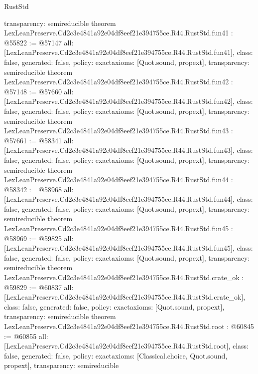 \begin{lexlean}{RustStd}
\begin{coremodule}
{  transparency: semireducible
}
theorem LexLeanPreserve.Cd2c3e4841a92e04df8eef21e394755ce.R44.RustStd.fun41 : @55822 := @57147 {
  all: [LexLeanPreserve.Cd2c3e4841a92e04df8eef21e394755ce.R44.RustStd.fun41],
  class: false,
  generated: false,
  policy: exact{axioms: [Quot.sound, propext]},
  transparency: semireducible
}
theorem LexLeanPreserve.Cd2c3e4841a92e04df8eef21e394755ce.R44.RustStd.fun42 : @57148 := @57660 {
  all: [LexLeanPreserve.Cd2c3e4841a92e04df8eef21e394755ce.R44.RustStd.fun42],
  class: false,
  generated: false,
  policy: exact{axioms: [Quot.sound, propext]},
  transparency: semireducible
}
theorem LexLeanPreserve.Cd2c3e4841a92e04df8eef21e394755ce.R44.RustStd.fun43 : @57661 := @58341 {
  all: [LexLeanPreserve.Cd2c3e4841a92e04df8eef21e394755ce.R44.RustStd.fun43],
  class: false,
  generated: false,
  policy: exact{axioms: [Quot.sound, propext]},
  transparency: semireducible
}
theorem LexLeanPreserve.Cd2c3e4841a92e04df8eef21e394755ce.R44.RustStd.fun44 : @58342 := @58968 {
  all: [LexLeanPreserve.Cd2c3e4841a92e04df8eef21e394755ce.R44.RustStd.fun44],
  class: false,
  generated: false,
  policy: exact{axioms: [Quot.sound, propext]},
  transparency: semireducible
}
theorem LexLeanPreserve.Cd2c3e4841a92e04df8eef21e394755ce.R44.RustStd.fun45 : @58969 := @59825 {
  all: [LexLeanPreserve.Cd2c3e4841a92e04df8eef21e394755ce.R44.RustStd.fun45],
  class: false,
  generated: false,
  policy: exact{axioms: [Quot.sound, propext]},
  transparency: semireducible
}
theorem LexLeanPreserve.Cd2c3e4841a92e04df8eef21e394755ce.R44.RustStd.crate_ok : @59829 := @60837 {
  all: [LexLeanPreserve.Cd2c3e4841a92e04df8eef21e394755ce.R44.RustStd.crate_ok],
  class: false,
  generated: false,
  policy: exact{axioms: [Quot.sound, propext]},
  transparency: semireducible
}
theorem LexLeanPreserve.Cd2c3e4841a92e04df8eef21e394755ce.R44.RustStd.root : @60845 := @60855 {
  all: [LexLeanPreserve.Cd2c3e4841a92e04df8eef21e394755ce.R44.RustStd.root],
  class: false,
  generated: false,
  policy: exact{axioms: [Classical.choice, Quot.sound, propext]},
  transparency: semireducible
}


\end{coremodule}
\end{lexlean}
